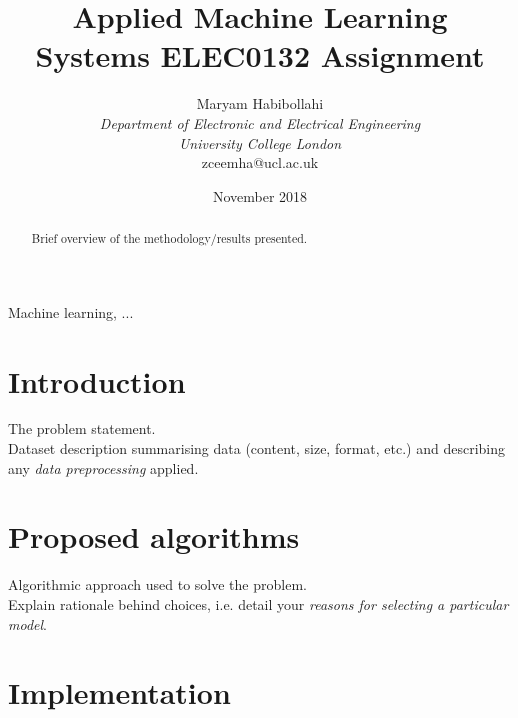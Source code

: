 \documentclass[conference]{IEEEtran}
\begin{document}
\title{Applied Machine Learning\\
 Systems ELEC0132 Assignment}
\author{Maryam Habibollahi\\ \textit{Department of Electronic and Electrical Engineering}\\ \textit{University College London}\\ zceemha@ucl.ac.uk}
\date{November 2018}
\maketitle


\begin{abstract}
Brief overview of the methodology/results presented.\\
\end{abstract}

\begin{IEEEkeywords}
Machine learning, ...
\end{IEEEkeywords}
\section{Introduction} \label{s-intro}

The problem statement.\\

Dataset description summarising data (content, size, format, etc.) and describing any \textit{data preprocessing} applied.\\

\section{Proposed algorithms} \label{s-algorithms}

Algorithmic approach used to solve the problem.\\

Explain rationale behind choices, i.e. detail your \textit{reasons for selecting a particular model}.\\

\section{Implementation} \label{s-implement}
\end{document}
